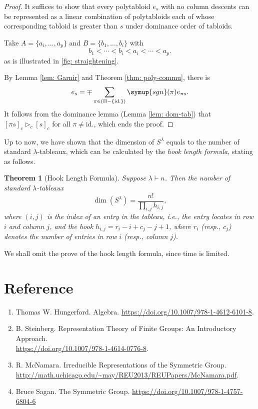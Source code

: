\documentclass{assignment}[2019/10/15]
\theoremstyle{plain}
\newtheorem{theorem}{Theorem}[section]
\newcommand{\sgn}{\mathop{}\!\symup{sgn}}
\newcommand{\id}{\text{id.}}
\numberwithin{equation}{section}
\begin{document}
    \begin{proof}
        It suffices to show that every polytabloid $e_s$ with no column descents can be represented as a linear combination of polytabloids each of whose corresponding tabloid is greater than $s$ under dominance order of tabloids.

        Take $A=\{a_i, \dotsc, a_p\}$ and $B = \{b_1, \dotsc, b_i\}$ with
        \begin{equation}
            b_1<\dotsb <b_i<a_i<\dotsb <a_p.
        \end{equation}
        as is illustrated in \ref{fig: straightening}.

        By Lemma \ref{lem: Garnir} and Theorem \ref{thm: poly-commu}, there is
        \begin{equation}
            e_s = \mp\sum_{\pi\in(\Pi-\{\id\})}\sgn(\pi)e_{\pi s}.
        \end{equation}
        It follows from the dominance lemma (Lemma \ref{lem: dom-tab}) that $[\pi s]_c\rhd_c[s]_c$ for all $\pi\neq \id$, which ends the proof.
    \end{proof}

    Up to now, we have shown that the dimension of $S^\lambda$ equals to the number of standard $\lambda$-tableaux, which can be calculated by the \emph{hook length formula}, stating as follows.

    \begin{theorem}[Hook Length Formula]
        Suppose $\lambda\vdash n$. Then the number of standard $\lambda$-tableaux
        \begin{equation}
            \dim(S^\lambda)=\frac{n!}{\prod_{i, j}h_{i, j}},
        \end{equation}
        where $(i, j)$ is the index of an entry in the tableau, i.e., the entry locates in row $i$ and column $j$, and the hook $h_{i, j} = r_i - i + c_j-j + 1$, where $r_i$ (resp., $c_j$) denotes the number of entries in row $i$ (resp., column $j$).
    \end{theorem}

    We shall omit the prove of the hook length formula, since time is limited.

    \section*{Reference}
    \begin{enumerate}[1]
        \item Thomas W. Hungerford. Algebra. \url{https://doi.org/10.1007/978-1-4612-6101-8}.
        \item B. Steinberg. Representation Theory of Finite Groups: An Introductory Approach. \\\url{https://doi.org/10.1007/978-1-4614-0776-8}.
        \item R. McNamara. Irreducible Representations of the Symmetric Group. \\\url{http://math.uchicago.edu/~may/REU2013/REUPapers/McNamara.pdf}.
        \item Bruce Sagan. The Symmetric Group. \url{https://doi.org/10.1007/978-1-4757-6804-6}
    \end{enumerate}
\end{document}
